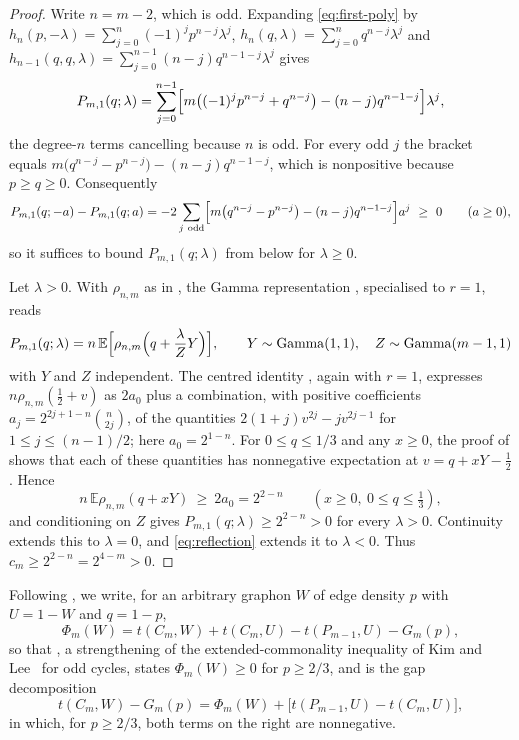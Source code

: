 \documentclass[11pt]{article}
\theoremstyle{remark}
\newcommand{\E}{\mathbb{E}}
\begin{document}
\begin{proof}
Write $n=m-2$, which is odd. Expanding \eqref{eq:first-poly} by
$h_{n}(p,-\lambda)=\sum_{j=0}^{n}(-1)^jp^{n-j}\lambda^j$,
$h_{n}(q,\lambda)=\sum_{j=0}^{n}q^{n-j}\lambda^j$ and
$h_{n-1}(q,q,\lambda)=\sum_{j=0}^{n-1}(n-j)q^{n-1-j}\lambda^j$ gives
\begin{equation}\label{eq:poly-expansion}
 P_{m,1}(q;\lambda)
 =\sum_{j=0}^{n-1}
 \Bigl[m\bigl((-1)^jp^{n-j}+q^{n-j}\bigr)
       -(n-j)q^{n-1-j}\Bigr]\lambda^j,
\end{equation}
the degree-$n$ terms cancelling because $n$ is odd. For every odd $j$
the bracket equals
$m\bigl(q^{n-j}-p^{n-j}\bigr)-(n-j)q^{n-1-j}$, which is nonpositive
because $p\geq q\geq0$. Consequently
\begin{equation}\label{eq:reflection}
 P_{m,1}(q;-a)-P_{m,1}(q;a)
 =-2\sum_{j\ \mathrm{odd}}
 \Bigl[m\bigl(q^{n-j}-p^{n-j}\bigr)-(n-j)q^{n-1-j}\Bigr]a^j\ \geq\ 0
 \qquad(a\geq0),
\end{equation}
so it suffices to bound $P_{m,1}(q;\lambda)$ from below for
$\lambda\geq0$.

Let $\lambda>0$. With $\rho_{n,m}$ as in \cite[Eq.~(5.7)]{kim2026goodman}, the
Gamma representation \cite[Eq.~(5.15)]{kim2026goodman}, specialised to $r=1$,
reads
\[
 P_{m,1}(q;\lambda)
 =n\,\E\Bigl[\rho_{n,m}\Bigl(q+\frac{\lambda}{Z}Y\Bigr)\Bigr],
 \qquad Y\sim\operatorname{Gamma}(1,1),\quad
 Z\sim\operatorname{Gamma}(m-1,1)
\]
with $Y$ and $Z$ independent. The centred identity
\cite[Eq.~(5.18)]{kim2026goodman}, again with $r=1$, expresses
$n\rho_{n,m}(\tfrac12+v)$ as $2a_0$ plus a combination, with positive
coefficients $a_j=2^{2j+1-n}\binom{n}{2j}$, of the quantities
$2(1+j)v^{2j}-jv^{2j-1}$ for $1\leq j\leq (n-1)/2$; here
$a_0=2^{1-n}$. For $0\leq q\leq1/3$ and any $x\geq0$, the proof of
\cite[Proposition~5.6]{kim2026goodman} shows that each of these quantities has
nonnegative expectation at $v=q+xY-\tfrac12$. Hence
\[
 n\,\E\rho_{n,m}(q+xY)\ \geq\ 2a_0=2^{2-n}
 \qquad(x\geq0,\ 0\leq q\leq\tfrac13),
\]
and conditioning on $Z$ gives $P_{m,1}(q;\lambda)\geq2^{2-n}>0$ for every
$\lambda>0$. Continuity extends this to $\lambda=0$, and
\eqref{eq:reflection} extends it to $\lambda<0$. Thus
$c_m\geq2^{2-n}=2^{4-m}>0$.
\end{proof}

Following \cite[Eq.~(6.1)]{kim2026goodman}, we write, for an arbitrary graphon
$W$ of edge density $p$ with $U=1-W$ and $q=1-p$,
\begin{equation}\label{eq:Phi-definition}
 \Phi_m(W)=t(C_m,W)+t(C_m,U)-t(P_{m-1},U)-G_m(p),
\end{equation}
so that \cite[Theorem~1.3]{kim2026goodman}, a strengthening of the
extended-commonality inequality of Kim and Lee~\cite{kim2024extended} for
odd cycles, states $\Phi_m(W)\geq0$ for $p\geq2/3$, and \cite[Eq.~(6.3)]{kim2026goodman} is the gap decomposition
\begin{equation}\label{eq:gap-decomposition}
 t(C_m,W)-G_m(p)
 =\Phi_m(W)+\bigl[t(P_{m-1},U)-t(C_m,U)\bigr],
\end{equation}
in which, for $p\geq2/3$, both terms on the right are nonnegative.
\end{document}
